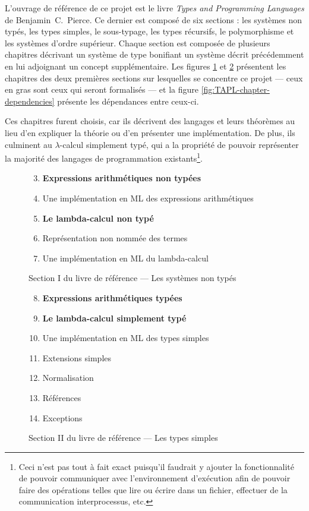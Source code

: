 \documentclass[a4paper, oneside, 12pt, titlepage]{article}
\begin{document}
L'ouvrage de référence de ce projet est le livre \emph{Types and Programming Languages} de
Benjamin~C.~Pierce. Ce dernier est composé de six sections : les systèmes non typés, les types
simples, le sous-typage, les types récursifs, le polymorphisme et les systèmes d'ordre supérieur.
Chaque section est composée de plusieurs chapitres décrivant un système de type bonifiant un système
décrit précédemment en lui adjoignant un concept supplémentaire. Les figures
\ref{fig:TAPL-section-1} et \ref{fig:TAPL-section-2} présentent les chapitres des deux premières
sections sur lesquelles se concentre ce projet --- ceux en gras sont ceux qui seront formalisés
--- et la figure \ref{fig:TAPL-chapter-dependencies} présente les dépendances entre ceux-ci.

Ces chapitres furent choisis, car ils décrivent des langages et leurs théorèmes au lieu d'en
expliquer la théorie ou d'en présenter une implémentation. De plus, ils culminent au
$\lambda$-calcul simplement typé, qui a la propriété de pouvoir représenter la majorité des langages
de programmation existants\footnote{Ceci n'est pas tout à fait exact puisqu'il faudrait y ajouter la
fonctionnalité de pouvoir communiquer avec l'environnement d'exécution afin de pouvoir faire des
opérations telles que lire ou écrire dans un fichier, effectuer de la communication interprocessus,
etc.}.

\begin{figure}[h]
  \begin{enumerate}[label=§ \arabic*]
      \setcounter{enumi}{2}
    \item \textbf{Expressions arithmétiques non typées}
    \item Une implémentation en ML des expressions arithmétiques
    \item \textbf{Le lambda-calcul non typé}
    \item Représentation non nommée des termes
    \item Une implémentation en ML du lambda-calcul
  \end{enumerate}
  \caption{Section I du livre de référence --- Les systèmes non typés}
  \label{fig:TAPL-section-1}
\end{figure}

\begin{figure}[h]
  \begin{enumerate}[label=§ \arabic*]
      \setcounter{enumi}{7}
    \item \textbf{Expressions arithmétiques typées}
    \item \textbf{Le lambda-calcul simplement typé}
    \item Une implémentation en ML des types simples
    \item Extensions simples
    \item Normalisation
    \item Références
    \item Exceptions
  \end{enumerate}
  \caption{Section II du livre de référence --- Les types simples}
  \label{fig:TAPL-section-2}
\end{figure}
\end{document}
